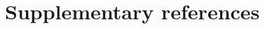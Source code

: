 \documentclass[
  bookmarksnumbered]{article}
\begin{document}
\section{Supplementary references}\label{refs}

\begin{multicols}{2}
\AtNextBibliography{\footnotesize}
\printbibliography[heading=none]
\normalsize
\end{multicols}

\def\printbibliography{}

\printbibliography
\end{document}
